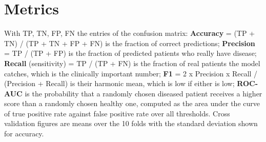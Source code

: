 \documentclass[12pt,a4paper,oneside]{report}
\begin{document}
\section{Metrics}
With TP, TN, FP, FN the entries of the confusion matrix: \textbf{Accuracy} = (TP + TN) / (TP + TN + FP + FN) is the fraction of correct predictions; \textbf{Precision} = TP / (TP + FP) is the fraction of predicted patients who really have disease; \textbf{Recall} (sensitivity) = TP / (TP + FN) is the fraction of real patients the model catches, which is the clinically important number; \textbf{F1} = 2 x Precision x Recall / (Precision + Recall) is their harmonic mean, which is low if either is low; \textbf{ROC-AUC} is the probability that a randomly chosen diseased patient receives a higher score than a randomly chosen healthy one, computed as the area under the curve of true positive rate against false positive rate over all thresholds. Cross validation figures are means over the 10 folds with the standard deviation shown for accuracy.
\end{document}
